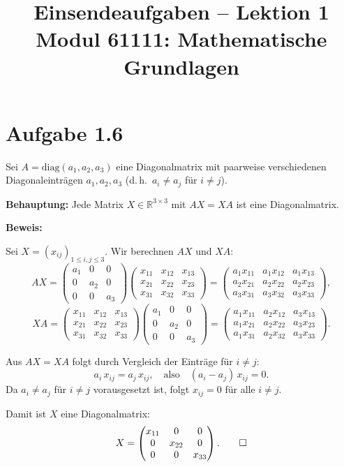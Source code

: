 \documentclass[a4paper,12pt]{article}
\title{Einsendeaufgaben -- Lektion 1\\[0.5em]
\large Modul 61111: Mathematische Grundlagen}
\author{}
\date{}
\begin{document}
\maketitle

\section*{Aufgabe 1.6}

Sei $A = \mathrm{diag}(a_1, a_2, a_3)$ eine Diagonalmatrix mit paarweise verschiedenen Diagonaleinträgen $a_1, a_2, a_3$ (d.\,h.\ $a_i \neq a_j$ für $i \neq j$).

\textbf{Behauptung:} Jede Matrix $X \in \mathbb{R}^{3 \times 3}$ mit $AX = XA$ ist eine Diagonalmatrix.

\medskip
\textbf{Beweis:}

Sei $X = (x_{ij})_{1 \le i,j \le 3}$. Wir berechnen $AX$ und $XA$:
\[
  AX =
  \begin{pmatrix} a_1 & 0 & 0 \\ 0 & a_2 & 0 \\ 0 & 0 & a_3 \end{pmatrix}
  \begin{pmatrix} x_{11} & x_{12} & x_{13} \\ x_{21} & x_{22} & x_{23} \\ x_{31} & x_{32} & x_{33} \end{pmatrix}
  =
  \begin{pmatrix} a_1 x_{11} & a_1 x_{12} & a_1 x_{13} \\
                  a_2 x_{21} & a_2 x_{22} & a_2 x_{23} \\
                  a_3 x_{31} & a_3 x_{32} & a_3 x_{33} \end{pmatrix},
\]
\[
  XA =
  \begin{pmatrix} x_{11} & x_{12} & x_{13} \\ x_{21} & x_{22} & x_{23} \\ x_{31} & x_{32} & x_{33} \end{pmatrix}
  \begin{pmatrix} a_1 & 0 & 0 \\ 0 & a_2 & 0 \\ 0 & 0 & a_3 \end{pmatrix}
  =
  \begin{pmatrix} a_1 x_{11} & a_2 x_{12} & a_3 x_{13} \\
                  a_1 x_{21} & a_2 x_{22} & a_3 x_{23} \\
                  a_1 x_{31} & a_2 x_{32} & a_3 x_{33} \end{pmatrix}.
\]

Aus $AX = XA$ folgt durch Vergleich der Einträge für $i \neq j$:
\[
  a_i \, x_{ij} = a_j \, x_{ij},
  \quad\text{also}\quad
  (a_i - a_j)\, x_{ij} = 0.
\]
Da $a_i \neq a_j$ für $i \neq j$ vorausgesetzt ist, folgt $x_{ij} = 0$ für alle $i \neq j$.

Damit ist $X$ eine Diagonalmatrix:
\[
  X = \begin{pmatrix} x_{11} & 0 & 0 \\ 0 & x_{22} & 0 \\ 0 & 0 & x_{33} \end{pmatrix}. \qed
\]
\end{document}
